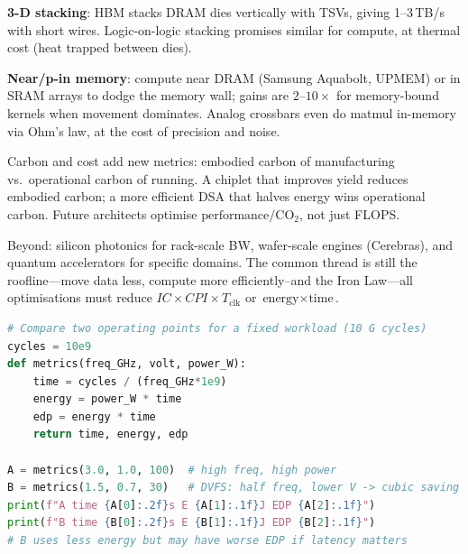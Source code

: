 \textbf{3-D stacking}: HBM stacks DRAM dies vertically with TSVs, giving 1--3\,TB/s with
short wires. Logic-on-logic stacking promises similar for compute, at thermal cost (heat
trapped between dies).

\textbf{Near/p-in memory}: compute near DRAM (Samsung Aquabolt, UPMEM) or in SRAM arrays
to dodge the memory wall; gains are $2$--$10\times$ for memory-bound kernels when
movement dominates. Analog crossbars even do matmul in-memory via Ohm's law, at the
cost of precision and noise.

Carbon and cost add new metrics: embodied carbon of manufacturing vs.\ operational
carbon of running. A chiplet that improves yield reduces embodied carbon; a more
efficient DSA that halves energy wins operational carbon. Future architects optimise
$\text{performance} / \text{CO}_2$, not just FLOPS.

Beyond: silicon photonics for rack-scale BW, wafer-scale engines (Cerebras), and quantum
accelerators for specific domains. The common thread is still the roofline---move data
less, compute more efficiently--and the Iron Law---all optimisations must reduce
$IC\times CPI\times T_{\text{clk}}$ or $ \text{energy}\times\text{time}$.

\begin{lstlisting}[language=Python, caption={EDP trade-off: race-to-sleep vs.\ DVFS low-power.}]
# Compare two operating points for a fixed workload (10 G cycles)
cycles = 10e9
def metrics(freq_GHz, volt, power_W):
    time = cycles / (freq_GHz*1e9)
    energy = power_W * time
    edp = energy * time
    return time, energy, edp

A = metrics(3.0, 1.0, 100)  # high freq, high power
B = metrics(1.5, 0.7, 30)   # DVFS: half freq, lower V -> cubic saving
print(f"A time {A[0]:.2f}s E {A[1]:.1f}J EDP {A[2]:.1f}")
print(f"B time {B[0]:.2f}s E {B[1]:.1f}J EDP {B[2]:.1f}")
# B uses less energy but may have worse EDP if latency matters
\end{lstlisting}


